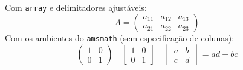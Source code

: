 \documentclass[a4paper]{article}
\begin{document}
Com \texttt{array} e delimitadores ajustáveis:
\[
  A = \left( \begin{array}{ccc}
        a_{11} & a_{12} & a_{13} \\
        a_{21} & a_{22} & a_{23}
      \end{array} \right)
\]
Com os ambientes do \texttt{amsmath} (sem especificação de colunas):
\[
  \begin{pmatrix} 1 & 0 \\ 0 & 1 \end{pmatrix} \quad
  \begin{bmatrix} 1 & 0 \\ 0 & 1 \end{bmatrix} \quad
  \begin{vmatrix} a & b \\ c & d \end{vmatrix} = ad - bc
\]
\end{document}
